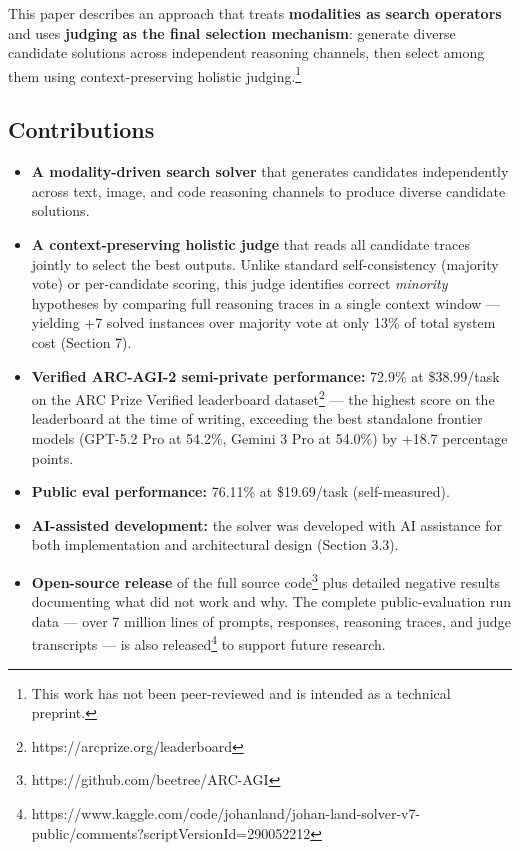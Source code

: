 \documentclass[11pt]{article}
\providecommand{\tightlist}{%
  \setlength{\itemsep}{0pt}\setlength{\parskip}{0pt}}
\begin{document}
This paper describes an approach that treats \textbf{modalities as
search operators} and uses \textbf{judging as the final selection
mechanism}: generate diverse candidate solutions across independent
reasoning channels, then select among them using context-preserving
holistic judging.\footnote{This work has not been peer-reviewed and is
  intended as a technical preprint.}

\hypertarget{contributions}{%
\subsection{Contributions}\label{contributions}}

\begin{itemize}
\tightlist
\item
  \textbf{A modality-driven search solver} that generates candidates
  independently across text, image, and code reasoning channels to
  produce diverse candidate solutions.
\item
  \textbf{A context-preserving holistic judge} that reads all candidate
  traces jointly to select the best outputs. Unlike standard
  self-consistency (majority vote) or per-candidate scoring, this judge
  identifies correct \emph{minority} hypotheses by comparing full
  reasoning traces in a single context window --- yielding +7 solved
  instances over majority vote at only 13\% of total system cost
  (Section 7).
\item
  \textbf{Verified ARC-AGI-2 semi-private performance:} 72.9\% at
  \$38.99/task on the ARC Prize Verified leaderboard dataset\footnote{https://arcprize.org/leaderboard}
  --- the highest score on the leaderboard at the time of writing,
  exceeding the best standalone frontier models (GPT-5.2 Pro at 54.2\%,
  Gemini 3 Pro at 54.0\%) by +18.7 percentage points.
\item
  \textbf{Public eval performance:} 76.11\% at \$19.69/task
  (self-measured).
\item
  \textbf{AI-assisted development:} the solver was developed with AI
  assistance for both implementation and architectural design (Section
  3.3).
\item
  \textbf{Open-source release} of the full source code\footnote{https://github.com/beetree/ARC-AGI}
  plus detailed negative results documenting what did not work and why.
  The complete public-evaluation run data --- over 7 million lines of
  prompts, responses, reasoning traces, and judge transcripts --- is
  also released\footnote{https://www.kaggle.com/code/johanland/johan-land-solver-v7-public/comments?scriptVersionId=290052212}
  to support future research.
\end{itemize}
\end{document}
